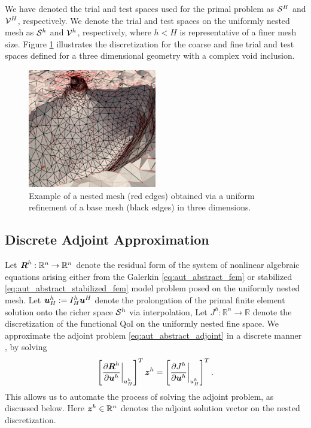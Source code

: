 We have denoted the trial and test spaces used for the primal problem
as $\S^H$ and $\V^H$, respectively. We denote the trial and test spaces on
the uniformly nested mesh as $\S^h$ and $\V^h$, respectively, where $h < H$
is representative of a finer mesh size. Figure \ref{fig:aut_glial_nested}
illustrates the discretization for the coarse and fine trial and test spaces
defined for a three dimensional geometry with a complex void inclusion.

\begin{figure}[ht!]
\centering
\includegraphics[width=0.5\textwidth]{img/aut_glial_nested}
\caption{Example of a nested mesh (red edges) obtained via a uniform
refinement of a base mesh (black edges) in three dimensions.}
\label{fig:aut_glial_nested}
\end{figure}

\subsection{Discrete Adjoint Approximation}

Let $\bs{R}^h : \mathbb{R}^n \to \mathbb{R}^n$ denote the residual form of
the system of nonlinear algebraic equations arising either from the Galerkin
\eqref{eq:aut_abstract_fem} or stabilized
\eqref{eq:aut_abstract_stabilized_fem}
model problem posed on the uniformly nested mesh. Let $\bs{u}^h_H :=
I^h_H \bs{u}^H$ denote the prolongation of the primal finite element solution
onto the richer space $\S^h$ via interpolation,
Let $J^h : \mathbb{R}^n \to
\mathbb{R}$ denote the discretization of the functional QoI on the
uniformly nested fine space. We approximate the adjoint problem
\eqref{eq:aut_abstract_adjoint} in a discrete manner
\cite{fidkowski2011review, venditti2000adjoint, venditti2002adjoint,
venditti2003adjoint}, by solving
%
\begin{gather}
\left[ \frac{\partial \bs{R}^h}{\partial \bs{u}^h} \biggr|_{u^h_H}
\right]^T \bs{z}^h = \left[ \frac{\partial J^h}{\partial \bs{u}^h}
\biggr|_{u^h_H} \right]^T.
\label{eq:aut_discrete_adjoint}
\end{gather}
%
This allows us to automate the process of solving the adjoint problem, as
discussed below. Here $\bs{z}^h \in \mathbb{R}^n$ denotes the adjoint
solution vector on the nested discretization.

